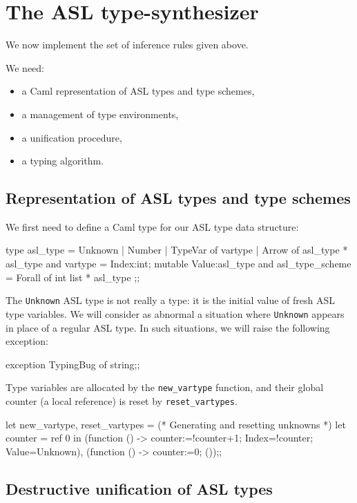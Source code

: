 \section{The ASL type-synthesizer}
%

We now implement the set of inference rules given above.

We need:
\begin{itemize}
\item a Caml representation of ASL types and type schemes,
\item a management of type environments,
\item a unification procedure,
\item a typing algorithm.
\end{itemize}

\subsection{Representation of ASL types and type schemes}
%

We first need to
define a Caml type for our ASL type data structure:
\begin{caml_example}
type asl_type = Unknown
              | Number
              | TypeVar of vartype
              | Arrow of asl_type * asl_type
and vartype = {Index:int; mutable Value:asl_type}
and asl_type_scheme = Forall of int list * asl_type ;;
\end{caml_example}
The {\tt Unknown} ASL type is not really a type: it is the initial value of
fresh ASL type variables. We will consider as abnormal a situation where
{\tt Unknown} appears in place of a regular ASL type. In such situations, we
will raise the following exception:
%
\begin{caml_example}
exception TypingBug of string;;
\end{caml_example}
Type variables are allocated by the \verb"new_vartype" function, and their
global counter (a local reference) is reset by \verb"reset_vartypes".
\begin{caml_example}
let new_vartype, reset_vartypes =
(* Generating and resetting unknowns *)
    let counter = ref 0
    in (function () -> counter:=!counter+1;
                       {Index=!counter; Value=Unknown}),
       (function () -> counter:=0; ());;
\end{caml_example}

\subsection{Destructive unification of ASL types}
%

